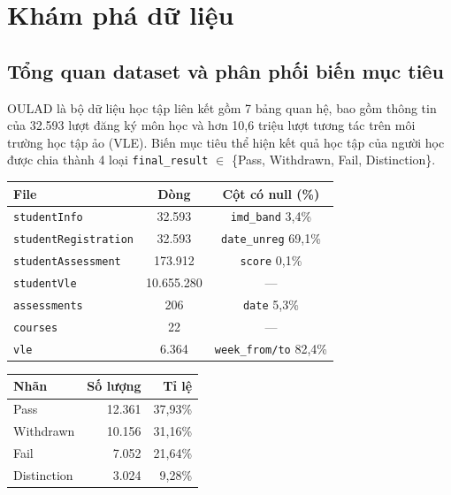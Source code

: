 \section{Khám phá dữ liệu}

\subsection{Tổng quan dataset và phân phối biến mục tiêu}

OULAD là bộ dữ liệu học tập liên kết gồm 7 bảng quan hệ, bao gồm thông tin của 32.593 lượt đăng ký môn học và hơn 10,6 triệu lượt tương tác trên môi trường học tập ảo (VLE). Biến mục tiêu thể hiện kết quả học tập của người học được chia thành 4 loại \texttt{final\_result} $\in$ \{Pass, Withdrawn, Fail, Distinction\}.

\begin{center}
\small
\renewcommand{\arraystretch}{1.3}
\begin{tabular}{|l|c|c|}
\hline
\textbf{File} & \textbf{Dòng} & \textbf{Cột có null (\%)} \\
\hline
\texttt{studentInfo}            & 32.593      & \texttt{imd\_band} 3,4\% \\
\texttt{studentRegistration}    & 32.593      & \texttt{date\_unreg} 69,1\% \\
\texttt{studentAssessment}      & 173.912     & \texttt{score} 0,1\% \\
\texttt{studentVle}             & 10.655.280  & --- \\
\texttt{assessments}            & 206         & \texttt{date} 5,3\% \\
\texttt{courses}                & 22          & --- \\
\texttt{vle}                    & 6.364       & \texttt{week\_from/to} 82,4\% \\
\hline
\end{tabular}
\end{center}

\begin{center}
\small
\renewcommand{\arraystretch}{1.3}
\begin{tabular}{|l|r|r|}
\hline
\textbf{Nhãn} & \textbf{Số lượng} & \textbf{Tỉ lệ} \\
\hline
Pass        & 12.361 & 37,93\% \\
Withdrawn   & 10.156 & 31,16\% \\
Fail        &  7.052 & 21,64\% \\
Distinction &  3.024 & \phantom{0}9,28\% \\
\hline
\end{tabular}
\end{center}

